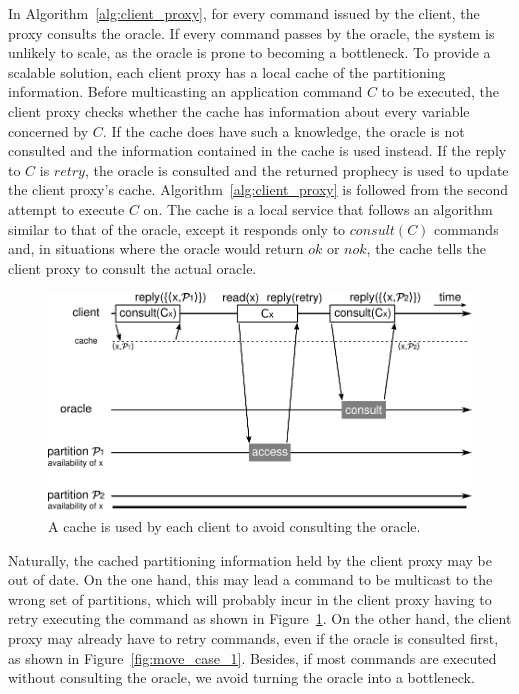 In Algorithm~\ref{alg:client_proxy}, for every command issued by the client, the proxy consults the oracle.
If every command passes by the oracle, the system is unlikely to scale, as the oracle is prone to becoming a bottleneck.
To provide a scalable solution, each client proxy has a local cache of the partitioning information.
Before multicasting an application command $C$ to be executed, the client proxy checks whether the cache has information about every variable concerned by $C$.
If the cache does have such a knowledge, the oracle is not consulted and the information contained in the cache is used instead.
If the reply to $C$ is $retry$, the oracle is consulted and the returned prophecy is used to update the client proxy's cache.
Algorithm~\ref{alg:client_proxy} is followed from the second attempt to execute $C$ on.
The cache is a local service that follows an algorithm similar to that of the oracle, except it responds only to $consult(C)$ commands and, in situations where the oracle would return $ok$ or $nok$, the cache tells the client proxy to consult the actual oracle.

\begin{figure}
  \includegraphics[width=\linewidth]{figures/cache_retry}
  \caption{A cache is used by each client to avoid consulting the oracle.}
  \label{fig:cache_retry}
\end{figure}

Naturally, the cached partitioning information held by the client proxy may be out of date.
On the one hand, this may lead a command to be multicast to the wrong set of partitions, which will probably incur in the client proxy having to retry executing the command as shown in Figure~\ref{fig:cache_retry}.
On the other hand, the client proxy may already have to retry commands, even if the oracle is consulted first, as shown in Figure~\ref{fig:move_case_1}.
Besides, if most commands are executed without consulting the oracle, we avoid turning the oracle into a bottleneck.


